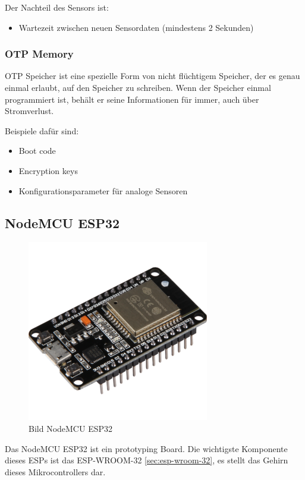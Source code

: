 Der Nachteil des Sensors ist:
\begin{itemize}
    \item Wartezeit zwischen neuen Sensordaten (mindestens 2 Sekunden)
\end{itemize}

\subsubsection{OTP Memory}\label{sec:otp}
OTP Speicher ist eine spezielle Form von nicht flüchtigem Speicher, der es genau einmal erlaubt, auf den Speicher zu schreiben. Wenn der Speicher einmal programmiert ist, behält er seine Informationen für immer, auch über Stromverlust.

Beispiele dafür sind:
\begin{itemize}
    \item Boot code
    \item Encryption keys
    \item Konfigurationsparameter für analoge Sensoren
\end{itemize}

\subsection{NodeMCU ESP32}
\label{sec:nodemcu_esp32}

\begin{figure}[H]
    \begin{center}
        \includegraphics[scale=0.8]{images/NodeMCU-ESP32.png}
        \caption{Bild NodeMCU ESP32 \cite{nodemcu_picture_joy-it}}
    \end{center}
\end{figure}

Das NodeMCU ESP32 ist ein prototyping Board. Die wichtigste Komponente dieses ESPs ist das ESP-WROOM-32 \ref{sec:esp-wroom-32}, es stellt das Gehirn dieses Mikrocontrollers dar.

